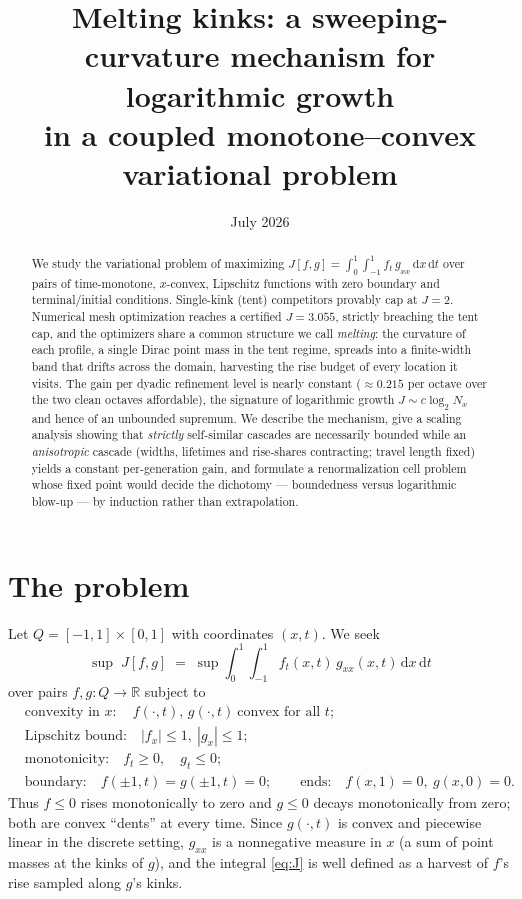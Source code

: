 \documentclass[11pt]{article}
\title{Melting kinks: a sweeping-curvature mechanism for logarithmic growth\\
in a coupled monotone--convex variational problem}
\author{}
\date{July 2026}
\newcommand{\dd}{\,\mathrm{d}}
\begin{document}
\maketitle

\begin{abstract}
We study the variational problem of maximizing
$J[f,g]=\int_0^1\!\!\int_{-1}^{1} f_t\,g_{xx}\dd x\dd t$ over pairs of
time-monotone, $x$-convex, Lipschitz functions with zero boundary and
terminal/initial conditions. Single-kink (tent) competitors provably cap at
$J=2$. Numerical mesh optimization reaches a certified $J=3.055$, strictly
breaching the tent cap, and the optimizers share a common structure we call
\emph{melting}: the curvature of each profile, a single Dirac point mass in
the tent regime, spreads into a finite-width band that drifts across the
domain, harvesting the rise budget of every location it visits. The gain per
dyadic refinement level is nearly constant ($\approx 0.215$ per octave over
the two clean octaves affordable), the signature of logarithmic growth
$J\sim c\log_2 N_x$ and hence of an unbounded supremum. We describe the
mechanism, give a scaling analysis showing that \emph{strictly} self-similar
cascades are necessarily bounded while an \emph{anisotropic} cascade
(widths, lifetimes and rise-shares contracting; travel length fixed) yields
a constant per-generation gain, and formulate a renormalization
cell problem whose fixed point would decide the dichotomy --- boundedness
versus logarithmic blow-up --- by induction rather than extrapolation.
\end{abstract}

\section{The problem}

Let $Q=[-1,1]\times[0,1]$ with coordinates $(x,t)$. We seek
\begin{equation}
\label{eq:J}
\sup\; J[f,g]\;=\;\sup\int_0^1\!\!\int_{-1}^{1} f_t(x,t)\,g_{xx}(x,t)\dd x\dd t
\end{equation}
over pairs $f,g:Q\to\mathbb{R}$ subject to
\begin{align*}
&\text{convexity in }x:\quad f(\cdot,t),\,g(\cdot,t)\ \text{convex for all }t;\\
&\text{Lipschitz bound:}\quad |f_x|\le 1,\ |g_x|\le 1;\\
&\text{monotonicity:}\quad f_t\ge 0,\quad g_t\le 0;\\
&\text{boundary:}\quad f(\pm1,t)=g(\pm1,t)=0;\qquad
\text{ends:}\quad f(x,1)=0,\ g(x,0)=0.
\end{align*}
Thus $f\le 0$ rises monotonically to zero and $g\le 0$ decays monotonically
from zero; both are convex ``dents'' at every time. Since $g(\cdot,t)$ is
convex and piecewise linear in the discrete setting, $g_{xx}$ is a
nonnegative measure in $x$ (a sum of point masses at the kinks of $g$), and
the integral \eqref{eq:J} is well defined as a harvest of $f$'s rise sampled
along $g$'s kinks.
\end{document}
